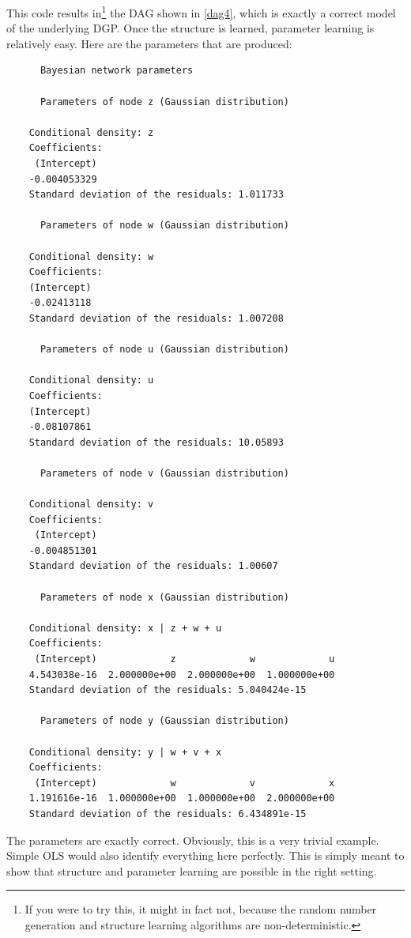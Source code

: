 \documentclass{article}
\begin{document}
This code results in\footnote{If you were to try this, it might in fact not, because the random number generation and structure learning algorithms are non-deterministic.} the DAG shown in \ref{dag4}, which is exactly a correct model of the underlying DGP. Once the structure is learned, parameter learning is relatively easy. Here are the parameters that are produced:

\begin{verbatim}
      Bayesian network parameters
    
      Parameters of node z (Gaussian distribution)
    
    Conditional density: z
    Coefficients:
     (Intercept)  
    -0.004053329  
    Standard deviation of the residuals: 1.011733 
    
      Parameters of node w (Gaussian distribution)
    
    Conditional density: w
    Coefficients:
    (Intercept)  
    -0.02413118  
    Standard deviation of the residuals: 1.007208 
    
      Parameters of node u (Gaussian distribution)
    
    Conditional density: u
    Coefficients:
    (Intercept)  
    -0.08107861  
    Standard deviation of the residuals: 10.05893 
    
      Parameters of node v (Gaussian distribution)
    
    Conditional density: v
    Coefficients:
     (Intercept)  
    -0.004851301  
    Standard deviation of the residuals: 1.00607 
    
      Parameters of node x (Gaussian distribution)
    
    Conditional density: x | z + w + u
    Coefficients:
     (Intercept)             z             w             u  
    4.543038e-16  2.000000e+00  2.000000e+00  1.000000e+00  
    Standard deviation of the residuals: 5.040424e-15 
    
      Parameters of node y (Gaussian distribution)
    
    Conditional density: y | w + v + x
    Coefficients:
     (Intercept)             w             v             x  
    1.191616e-16  1.000000e+00  1.000000e+00  2.000000e+00  
    Standard deviation of the residuals: 6.434891e-15 
\end{verbatim}

The parameters are exactly correct. Obviously, this is a very trivial example. Simple OLS would also identify everything here perfectly. This is simply meant to show that structure and parameter learning are possible in the right setting.
\end{document}
